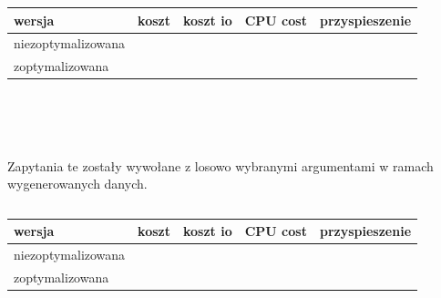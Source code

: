 \documentclass[11pt]{article}
\numberwithin{figure}{subsection}
\begin{document}
		\begin{tabularx}{\textwidth}{|X|X|X|X|X|}
			\hline
			wersja & koszt & koszt io & CPU cost & przyspieszenie \\
			\hline
			niezoptymalizowana &  &  &  &  \\
			\hline
			zoptymalizowana &  &  &  &  \\
			\hline
		\end{tabularx}
		
		\begin{tabularx}{\textwidth}{|X|X|X|X|X|X|}
		\end{tabularx}
		
		\begin{tabularx}{\textwidth}{|X|X|X|X|X|X|}
		\end{tabularx}
		

		
		
		
		
		
		
		
		
		
		
	
	\subsection{}
			
		\begin{lstlisting}[caption={Wersja niezoptymalizowana},captionpos=b]
		\end{lstlisting}
			
		\begin{lstlisting}[caption={Wersja zoptymalizowana},captionpos=b]
		\end{lstlisting}
		
		Zapytania te zostały wywołane z losowo wybranymi argumentami w ramach
		wygenerowanych danych. \\
		
		\begin{lstlisting}[caption={Wywołanie zapytań}, captionpos=b]
		\end{lstlisting}
		
		\begin{tabularx}{\textwidth}{|X|X|X|X|X|}
			\hline
			wersja & koszt & koszt io & CPU cost & przyspieszenie \\
			\hline
			niezoptymalizowana &  &  &  &  \\
			\hline
			zoptymalizowana &  &  &  &  \\
			\hline
		\end{tabularx}
		
		\begin{tabularx}{\textwidth}{|X|X|X|X|X|X|}
		\end{tabularx}
		
		\begin{tabularx}{\textwidth}{|X|X|X|X|X|X|}
		\end{tabularx}
		

		
		
		
		
		
		
		

\newpage
\printbibliography
\end{document}
